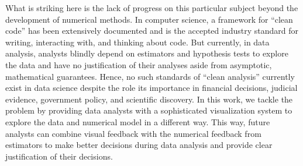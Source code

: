 What is striking here is the lack of progress on this particular subject beyond the development of numerical methods. In computer science, a framework for ``clean code'' has been extensively documented and is the accepted industry standard for writing, interacting with, and thinking about code. But currently, in data analysis, analysts blindly depend on estimators and hypothesis tests to explore the data and have no justification of their analyses aside from asymptotic, mathematical guarantees. Hence, no such standards of ``clean analysis'' currently exist in data science despite the role its importance in financial decisions, judicial evidence, government policy, and scientific discovery. In this work, we tackle the problem by providing data analysts with a sophisticated visualization system to explore the data and numerical model in a different way. This way, future analysts can combine visual feedback with the numerical feedback from estimators to make better decisions during data analysis and provide clear justification of their decisions.
